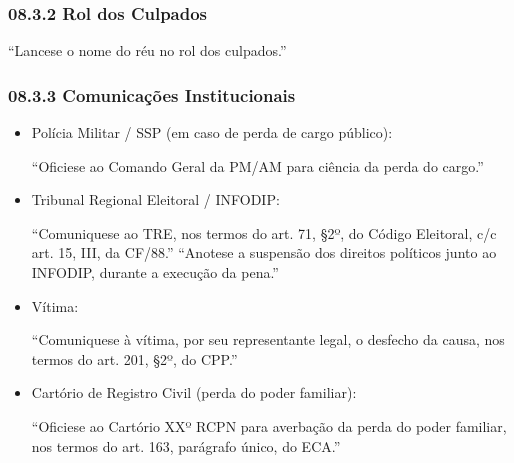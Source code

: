 \documentclass[letterpaper,10pt,brazil]{sphinxmanual}
\begin{document}
\subsubsection{08.3.2 \textendash{} Rol dos Culpados}
\label{\detokenize{08sentenca_disposicoesfinais:rol-dos-culpados}}
\sphinxAtStartPar
“Lance\sphinxhyphen{}se o nome do réu no rol dos culpados.”


\subsubsection{08.3.3 \textendash{} Comunicações Institucionais}
\label{\detokenize{08sentenca_disposicoesfinais:comunicacoes-institucionais}}\begin{itemize}
\item {} 
\sphinxAtStartPar
Polícia Militar / SSP (em caso de perda de cargo público):

\begin{sphinxVerbatim}[commandchars=\\\{\}]
“Oficie\PYGZhy{}se ao Comando Geral da PM/AM para ciência da perda do cargo.”
\end{sphinxVerbatim}

\item {} 
\sphinxAtStartPar
Tribunal Regional Eleitoral / INFODIP:

\begin{sphinxVerbatim}[commandchars=\\\{\}]
“Comunique\PYGZhy{}se ao TRE, nos termos do art. 71, \S{}2º, do Código Eleitoral, c/c art. 15, III, da CF/88.”
“Anote\PYGZhy{}se a suspensão dos direitos políticos junto ao INFODIP, durante a execução da pena.”
\end{sphinxVerbatim}

\item {} 
\sphinxAtStartPar
Vítima:

\begin{sphinxVerbatim}[commandchars=\\\{\}]
“Comunique\PYGZhy{}se à vítima, por seu representante legal, o desfecho da causa, nos termos do art. 201, \S{}2º, do CPP.”
\end{sphinxVerbatim}

\item {} 
\sphinxAtStartPar
Cartório de Registro Civil (perda do poder familiar):

\begin{sphinxVerbatim}[commandchars=\\\{\}]
“Oficie\PYGZhy{}se ao Cartório XXº RCPN para averbação da perda do poder familiar, nos termos do art. 163, parágrafo único, do ECA.”
\end{sphinxVerbatim}


\end{itemize}
\end{document}
